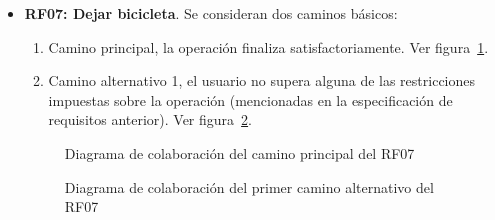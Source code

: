 \begin{itemize}
	\FloatBarrier
	\item \textbf{RF07: Dejar bicicleta}. Se consideran dos caminos básicos: 
	\begin{enumerate}
		\item Camino principal, la operación finaliza satisfactoriamente. Ver figura~\ref{fig:diagramaColaboracion_RF07_1}.
		\item Camino alternativo 1, el usuario no supera alguna de las restricciones impuestas sobre la operación (mencionadas en la especificación de requisitos anterior). Ver figura~\ref{fig:diagramaColaboracion_RF07_2}.
	\end{enumerate}
	\begin{figure} [!htb]
		\centering
		\caption{Diagrama de colaboración del camino principal del RF07}
		\label{fig:diagramaColaboracion_RF07_1}
	\end{figure}
	\begin{figure} [!htb]
		\centering
		\caption{Diagrama de colaboración del primer camino alternativo del RF07}
		\label{fig:diagramaColaboracion_RF07_2}
	\end{figure}
	

\end{itemize}
